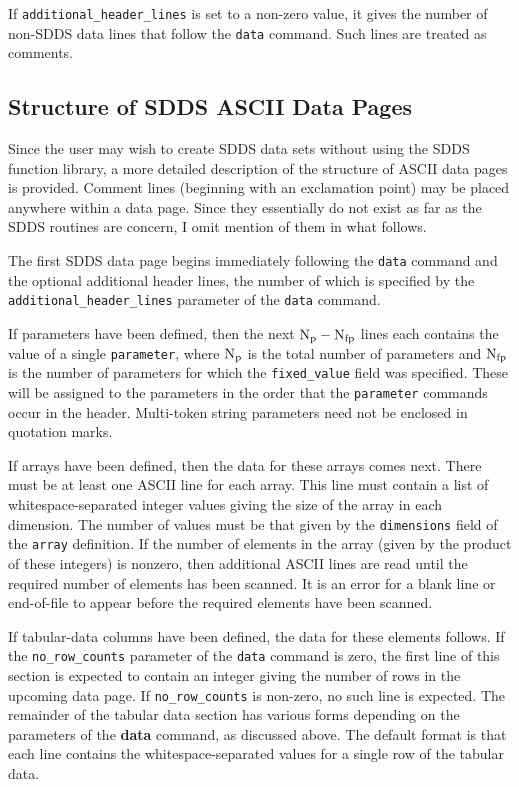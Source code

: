 \documentclass[11pt]{article}
\begin{document}
If {\tt additional\_header\_lines} is set to a non-zero value, it gives the number of non-SDDS data lines that follow the {\tt data} command.  Such lines are treated as comments.

\subsection{Structure of SDDS ASCII Data Pages}

Since the user may wish to create SDDS data sets without using the SDDS function library, a more detailed description of the structure of ASCII data pages is provided.  Comment lines (beginning with an exclamation point) may be placed anywhere within a data page.  Since they essentially do not exist as far as the SDDS routines are concern, I omit mention of them in what follows.

The first SDDS data page begins immediately following the {\tt data} command and the optional additional header lines, the number of which is specified by the \verb|additional_header_lines| parameter of the {\tt data} command.

If parameters have been defined, then the next ${\rm N_p-N_{fp}}$ lines each contains the value of a single {\tt parameter}, where ${\rm N_p}$ is the total number of parameters and ${\rm N_{fp}}$ is the number of parameters for which the \verb|fixed_value| field was specified.  These will be assigned to the parameters in the order that the \verb|parameter| commands occur in the header.  Multi-token string parameters need not be enclosed in quotation marks.

If arrays have been defined, then the data for these arrays comes next.  There must be at least one ASCII line for each array.  This line must contain a list of whitespace-separated integer values giving the size of the array in each dimension.  The number of values must be that given by the {\tt dimensions} field of the {\tt array} definition.  If the number of elements in the array (given by the product of these integers) is nonzero, then additional ASCII lines are read until the required number of elements has been scanned.  It is an error for a blank line or end-of-file to appear before the required elements have been scanned.

If tabular-data columns have been defined, the data for these elements follows. If the \verb|no_row_counts| parameter of the {\tt data} command is zero, the first line of this section is expected to contain an integer giving the number of rows in the upcoming data page.  If \verb|no_row_counts| is non-zero, no such line is expected.  The remainder of the tabular data section has various forms depending on the parameters of the {\bf data} command, as discussed above.  The default format is that each line contains the whitespace-separated values for a single row of the tabular data.  
\end{document}
